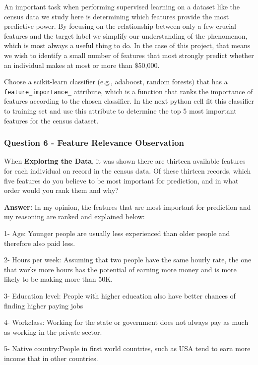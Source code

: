 \documentclass[11pt]{article}
\begin{document}
An important task when performing supervised learning on a dataset like
the census data we study here is determining which features provide the
most predictive power. By focusing on the relationship between only a
few crucial features and the target label we simplify our understanding
of the phenomenon, which is most always a useful thing to do. In the
case of this project, that means we wish to identify a small number of
features that most strongly predict whether an individual makes at most
or more than \$50,000.

Choose a scikit-learn classifier (e.g., adaboost, random forests) that
has a \texttt{feature\_importance\_} attribute, which is a function that
ranks the importance of features according to the chosen classifier. In
the next python cell fit this classifier to training set and use this
attribute to determine the top 5 most important features for the census
dataset.

    \subsubsection{Question 6 - Feature Relevance
Observation}\label{question-6---feature-relevance-observation}

When \textbf{Exploring the Data}, it was shown there are thirteen
available features for each individual on record in the census data. Of
these thirteen records, which five features do you believe to be most
important for prediction, and in what order would you rank them and why?

    \textbf{Answer:} In my opinion, the features that are most important for
prediction and my reasoning are ranked and explained below:

1- Age: Younger people are usually less experienced than older people
and therefore also paid less.

2- Hours per week: Assuming that two people have the same hourly rate,
the one that works more hours has the potential of earning more money
and is more likely to be making more than 50K.

3- Education level: People with higher education also have better
chances of finding higher paying jobs

4- Workclass: Working for the state or government does not always pay as
much as working in the private sector.

5- Native country:People in first world countries, such as USA tend to
earn more income that in other countries.
\end{document}
